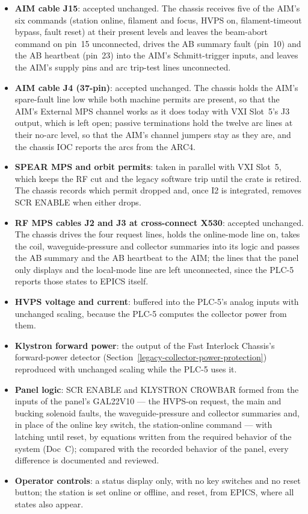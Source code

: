 \begin{itemize}
\tightlist
\item
  \textbf{AIM cable J15}: accepted unchanged. The chassis receives five of the AIM's six commands (station online, filament and focus, HVPS on, filament-timeout bypass, fault reset) at their present levels and leaves the beam-abort command on pin~15 unconnected, drives the AB summary fault (pin~10) and the AB heartbeat (pin~23) into the AIM's Schmitt-trigger inputs, and leaves the AIM's supply pins and arc trip-test lines unconnected.
\item
  \textbf{AIM cable J4 (37-pin)}: accepted unchanged. The chassis holds the AIM's spare-fault line low while both machine permits are present, so that the AIM's External MPS channel works as it does today with VXI Slot~5's J3 output, which is left open; passive terminations hold the twelve arc lines at their no-arc level, so that the AIM's channel jumpers stay as they are, and the chassis IOC reports the arcs from the ARC4.
\item
  \textbf{SPEAR MPS and orbit permits}: taken in parallel with VXI Slot~5, which keeps the RF cut and the legacy software trip until the crate is retired. The chassis records which permit dropped and, once I2 is integrated, removes SCR ENABLE when either drops.
\item
  \textbf{RF MPS cables J2 and J3 at cross-connect X530}: accepted unchanged. The chassis drives the four request lines, holds the online-mode line on, takes the coil, waveguide-pressure and collector summaries into its logic and passes the AB summary and the AB heartbeat to the AIM; the lines that the panel only displays and the local-mode line are left unconnected, since the PLC-5 reports those states to EPICS itself.
\item
  \textbf{HVPS voltage and current}: buffered into the PLC-5's analog inputs with unchanged scaling, because the PLC-5 computes the collector power from them.
\item
  \textbf{Klystron forward power}: the output of the Fast Interlock Chassis's forward-power detector (Section~\ref{legacy-collector-power-protection}) reproduced with unchanged scaling while the PLC-5 uses it.
\item
  \textbf{Panel logic}: SCR ENABLE and KLYSTRON CROWBAR formed from the inputs of the panel's GAL22V10 --- the HVPS-on request, the main and bucking solenoid faults, the waveguide-pressure and collector summaries and, in place of the online key switch, the station-online command --- with latching until reset, by equations written from the required behavior of the system (Doc~C); compared with the recorded behavior of the panel, every difference is documented and reviewed.
\item
  \textbf{Operator controls}: a status display only, with no key switches and no reset button; the station is set online or offline, and reset, from EPICS, where all states also appear.
\end{itemize}

